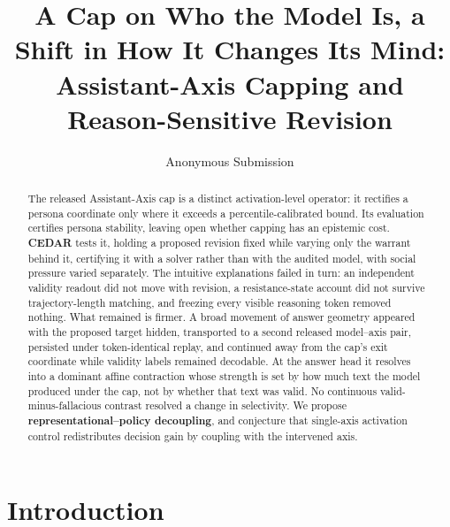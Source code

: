 \documentclass[letterpaper]{article} %
\title{A Cap on Who the Model Is, a Shift in How It Changes Its Mind:\\Assistant-Axis Capping and Reason-Sensitive Revision}
\author{Anonymous Submission}
\begin{document}
\maketitle

\begin{abstract}
The released Assistant-Axis cap is a distinct activation-level operator: it rectifies a persona coordinate only where it exceeds a percentile-calibrated bound. Its evaluation certifies persona stability, leaving open whether capping has an epistemic cost. \textbf{CEDAR} tests it, holding a proposed revision fixed while varying only the warrant behind it, certifying it with a solver rather than with the audited model, with social pressure varied separately. The intuitive explanations failed in turn: an independent validity readout did not move with revision, a resistance-state account did not survive trajectory-length matching, and freezing every visible reasoning token removed nothing. What remained is firmer. A broad movement of answer geometry appeared with the proposed target hidden, transported to a second released model--axis pair, persisted under token-identical replay, and continued away from the cap's exit coordinate while validity labels remained decodable. At the answer head it resolves into a dominant affine contraction whose strength is set by how much text the model produced under the cap, not by whether that text was valid. No continuous valid-minus-fallacious contrast resolved a change in selectivity. We propose \textbf{representational--policy decoupling}, and conjecture that single-axis activation control redistributes decision gain by coupling with the intervened axis.
\end{abstract}


\section{Introduction}
\label{sec:introduction}
\end{document}
